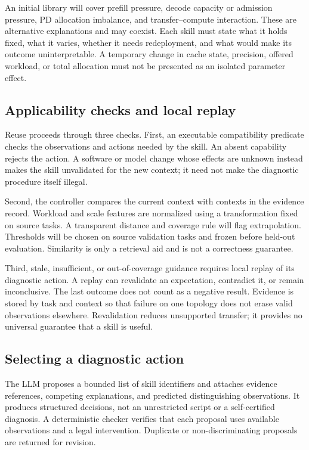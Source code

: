 \documentclass[11pt,a4paper]{article}
\begin{document}
An initial library will cover prefill pressure, decode capacity or admission pressure, PD allocation imbalance, and transfer--compute interaction. These are alternative explanations and may coexist. Each skill must state what it holds fixed, what it varies, whether it needs redeployment, and what would make its outcome uninterpretable. A temporary change in cache state, precision, offered workload, or total allocation must not be presented as an isolated parameter effect.

\subsection{Applicability checks and local replay}
Reuse proceeds through three checks. First, an executable compatibility predicate checks the observations and actions needed by the skill. An absent capability rejects the action. A software or model change whose effects are unknown instead makes the skill unvalidated for the new context; it need not make the diagnostic procedure itself illegal.

Second, the controller compares the current context with contexts in the evidence record. Workload and scale features are normalized using a transformation fixed on source tasks. A transparent distance and coverage rule will flag extrapolation. Thresholds will be chosen on source validation tasks and frozen before held-out evaluation. Similarity is only a retrieval aid and is not a correctness guarantee.

Third, stale, insufficient, or out-of-coverage guidance requires local replay of its diagnostic action. A replay can revalidate an expectation, contradict it, or remain inconclusive. The last outcome does not count as a negative result. Evidence is stored by task and context so that failure on one topology does not erase valid observations elsewhere. Revalidation reduces unsupported transfer; it provides no universal guarantee that a skill is useful.

\subsection{Selecting a diagnostic action}
The LLM proposes a bounded list of skill identifiers and attaches evidence references, competing explanations, and predicted distinguishing observations. It produces structured decisions, not an unrestricted script or a self-certified diagnosis. A deterministic checker verifies that each proposal uses available observations and a legal intervention. Duplicate or non-discriminating proposals are returned for revision.
\end{document}
